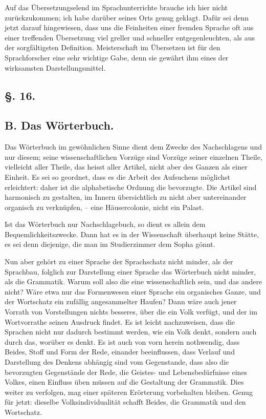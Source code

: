 \label{fp.128}

Auf das Übersetzungselend im Sprachunterrichte brauche ich hier nicht zurückzukommen; ich habe darüber seines Orts genug geklagt. Dafür sei denn \label{sp.121} jetzt darauf hingewiesen, dass uns die Feinheiten einer fremden Sprache oft aus einer treffenden Übersetzung viel greller und schneller entgegenleuchten, als aus der sorgfältigsten Definition. Meisterschaft im Übersetzen ist für den Sprachforscher eine sehr wichtige Gabe, denn sie gewährt ihm eines der wirksamsten Darstellungsmittel.

\subsection*{§. 16.}\label{II.VI.16}
\subsection*{B. Das Wörterbuch.}

Das Wörterbuch im gewöhnlichen Sinne dient dem Zwecke des Nachschlagens und nur diesem; seine wissenschaftlichen Vorzüge sind Vorzüge seiner einzelnen Theile, vielleicht aller Theile, das heisst aller Artikel, nicht aber des Ganzen als einer Einheit. Es sei so geordnet, dass es die Arbeit des Aufsuchens möglichst erleichtert: daher ist die alphabetische Ordnung die bevorzugte. Die Artikel sind harmonisch zu gestalten, im Innern übersichtlich zu  nicht aber untereinander organisch zu verknüpfen, – eine Häusercolonie, nicht ein Palast.

Ist das Wörterbuch nur Nachschlagebuch, so dient es allein dem Bequemlichkeitszwecke. Dann hat es in der Wissenschaft überhaupt keine Stätte, es sei denn diejenige, die man im Studierzimmer dem Sopha gönnt.

\largerpage[-1]Nun aber gehört zu einer Sprache der Sprachschatz nicht minder, als der Sprachbau, folglich zur Darstellung einer Sprache das Wörterbuch nicht minder, als die Grammatik. Warum soll also die eine wissenschaftlich sein, und das andere nicht? Wäre etwa nur das Formenwesen einer Sprache ein organisches Ganze, und der Wortschatz ein zufällig angesammelter Haufen? Dann wäre auch jener Vorrath von Vorstellungen nichts besseres, über die ein Volk verfügt, und der im Wortvorrathe seinen Ausdruck findet. Es ist leicht nachzuweisen, dass die Sprachen nicht nur dadurch bestimmt werden, wie ein Volk denkt, sondern auch durch das, worüber es denkt. Es ist auch von vorn herein nothwendig, dass Beides, Stoff und Form der Rede, einander beeinflussen, dass Verlauf und Darstellung des Denkens abhängig sind vom Gegenstande, dass also die bevorzugten Gegenstände der Rede, die Geistes- und Lebensbedürfnisse eines Volkes, einen Einfluss üben müssen auf die Gestaltung der Grammatik. Dies weiter zu verfolgen, mag einer späteren Erörterung \label{fp.129} vorbehalten bleiben. Genug für jetzt: dieselbe Volksindividualität schafft Beides, die Grammatik und den Wortschatz.

